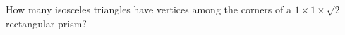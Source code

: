 How many isosceles triangles have vertices among the corners of a $1\times1\times\sqrt2$ rectangular prism?
